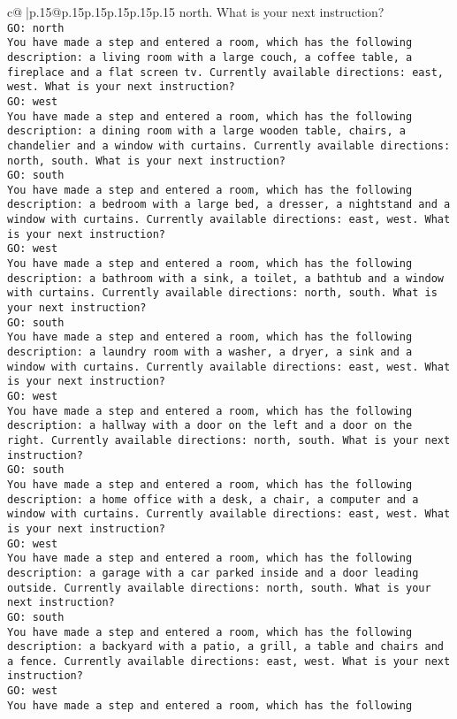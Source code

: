 \documentclass{article}
\begin{document}
{\begin{supertabular}{c@{$\;$}|p{.15\linewidth}@{}p{.15\linewidth}p{.15\linewidth}p{.15\linewidth}p{.15\linewidth}p{.15\linewidth}}
{{{north. What is your next instruction?\\ \tt GO: north\\ \tt You have made a step and entered a room, which has the following description: a living room with a large couch, a coffee table, a fireplace and a flat screen tv. Currently available directions: east, west. What is your next instruction?\\ \tt GO: west\\ \tt You have made a step and entered a room, which has the following description: a dining room with a large wooden table, chairs, a chandelier and a window with curtains. Currently available directions: north, south. What is your next instruction?\\ \tt GO: south\\ \tt You have made a step and entered a room, which has the following description: a bedroom with a large bed, a dresser, a nightstand and a window with curtains. Currently available directions: east, west. What is your next instruction?\\ \tt GO: west\\ \tt You have made a step and entered a room, which has the following description: a bathroom with a sink, a toilet, a bathtub and a window with curtains. Currently available directions: north, south. What is your next instruction?\\ \tt GO: south\\ \tt You have made a step and entered a room, which has the following description: a laundry room with a washer, a dryer, a sink and a window with curtains. Currently available directions: east, west. What is your next instruction?\\ \tt GO: west\\ \tt You have made a step and entered a room, which has the following description: a hallway with a door on the left and a door on the right. Currently available directions: north, south. What is your next instruction?\\ \tt GO: south\\ \tt You have made a step and entered a room, which has the following description: a home office with a desk, a chair, a computer and a window with curtains. Currently available directions: east, west. What is your next instruction?\\ \tt GO: west\\ \tt You have made a step and entered a room, which has the following description: a garage with a car parked inside and a door leading outside. Currently available directions: north, south. What is your next instruction?\\ \tt GO: south\\ \tt You have made a step and entered a room, which has the following description: a backyard with a patio, a grill, a table and chairs and a fence. Currently available directions: east, west. What is your next instruction?\\ \tt GO: west\\ \tt You have made a step and entered a room, which has the following }}}
\end{supertabular}}
\end{document}
